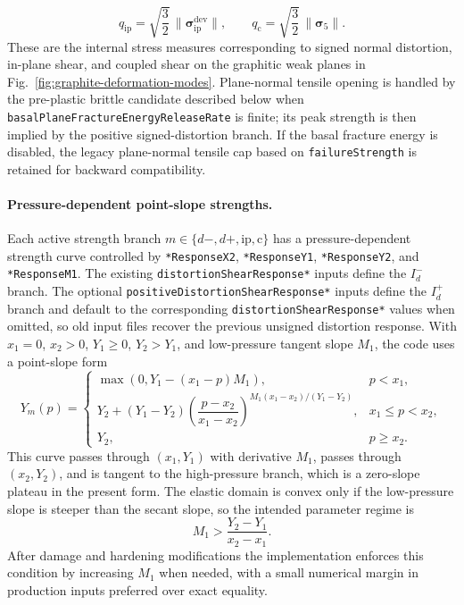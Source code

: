 \begin{equation}
  q_{\mathrm{ip}} = \sqrt{\frac{3}{2}}\,\|\boldsymbol{\sigma}_{\mathrm{ip}}^{\mathrm{dev}}\|,
  \qquad
  q_{\mathrm{c}} = \sqrt{\frac{3}{2}}\,\|\boldsymbol{\sigma}_5\|.
  \label{eq:graphite-mode-invariants}
\end{equation}
These are the internal stress measures corresponding to signed normal distortion, in-plane shear, and coupled shear on the graphitic weak planes in Fig.~\ref{fig:graphite-deformation-modes}.  Plane-normal tensile opening is handled by the pre-plastic brittle candidate described below when \texttt{basalPlaneFractureEnergyReleaseRate} is finite; its peak strength is then implied by the positive signed-distortion branch.  If the basal fracture energy is disabled, the legacy plane-normal tensile cap based on \texttt{failureStrength} is retained for backward compatibility.

\paragraph{Pressure-dependent point-slope strengths.}
Each active strength branch \(m\in\{d-,d+,\mathrm{ip},\mathrm{c}\}\) has a pressure-dependent strength curve controlled by \texttt{*ResponseX2}, \texttt{*ResponseY1}, \texttt{*ResponseY2}, and \texttt{*ResponseM1}.  The existing \texttt{distortionShearResponse*} inputs define the \(I_d^-\) branch.  The optional \texttt{positiveDistortionShearResponse*} inputs define the \(I_d^+\) branch and default to the corresponding \texttt{distortionShearResponse*} values when omitted, so old input files recover the previous unsigned distortion response.  With \(x_1=0\), \(x_2>0\), \(Y_1\ge 0\), \(Y_2>Y_1\), and low-pressure tangent slope \(M_1\), the code uses a point-slope form
\begin{equation}
Y_m(p)=
\begin{cases}
  \max\left(0, Y_1-(x_1-p)M_1\right), & p<x_1,\\[0.4em]
  Y_2+(Y_1-Y_2)\left(\dfrac{p-x_2}{x_1-x_2}\right)^{M_1(x_1-x_2)/(Y_1-Y_2)}, & x_1\le p < x_2,\\[0.8em]
  Y_2, & p\ge x_2.
\end{cases}
\label{eq:graphite-point-slope-strength}
\end{equation}
This curve passes through \((x_1,Y_1)\) with derivative \(M_1\), passes through \((x_2,Y_2)\), and is tangent to the high-pressure branch, which is a zero-slope plateau in the present form.  The elastic domain is convex only if the low-pressure slope is steeper than the secant slope, so the intended parameter regime is
\begin{equation}
  M_1 > \frac{Y_2-Y_1}{x_2-x_1}.
  \label{eq:graphite-point-slope-convexity}
\end{equation}
After damage and hardening modifications the implementation enforces this condition by increasing \(M_1\) when needed, with a small numerical margin in production inputs preferred over exact equality.


